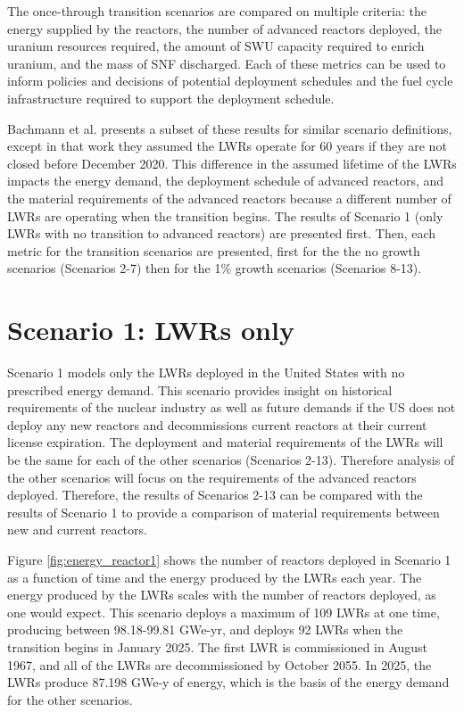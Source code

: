 The once-through transition scenarios are compared on multiple 
criteria: the energy supplied by the reactors, the number of 
advanced reactors deployed, the uranium resources required, the 
amount of \gls{SWU} capacity required to enrich uranium, and the 
mass of \gls{SNF} discharged. Each of these metrics can be used to inform 
policies and decisions of potential deployment schedules and the 
fuel cycle infrastructure required to support the deployment schedule. 

Bachmann et al. \cite{bachmann_enrichment_2021} presents a subset of 
these results for similar scenario definitions, except in that work 
they assumed the 
\glspl{LWR} operate for 60 years if they are not closed before December 
2020. This difference in 
the assumed lifetime of the \glspl{LWR} impacts the energy demand, 
the deployment schedule of advanced reactors, and the material 
requirements of the advanced reactors because a different number of 
\glspl{LWR} are operating when the transition begins. The results of 
Scenario 1 (only \glspl{LWR} with no transition to advanced reactors) 
are presented first. Then, each metric for the transition scenarios are 
presented, first for the the no growth scenarios 
(Scenarios 2-7) then for the 1\% growth scenarios (Scenarios 
8-13).

\section{Scenario 1: LWRs only}\label{sec:scenario1}
Scenario 1 models only the \glspl{LWR} deployed in the United States with no 
prescribed energy demand. This scenario provides insight on historical 
requirements of the nuclear industry as well as future demands if the 
US does not deploy any new reactors and decommissions current reactors at 
their current license expiration. The 
deployment and material requirements of the \glspl{LWR} will be the same 
for each of the other scenarios (Scenarios 2-13). Therefore analysis 
of the other scenarios will focus on the requirements of 
the advanced reactors deployed. Therefore, the results of Scenarios 2-13 
can be compared with the results of Scenario 1 to provide a comparison 
of material requirements between new and current reactors. 

Figure \ref{fig:energy_reactor1} shows the number of 
reactors deployed in Scenario 1 as a function of time and the energy 
produced by the \glspl{LWR} each year. The energy produced by the 
\glspl{LWR} scales with the number of reactors deployed, as 
one would expect. This scenario deploys a maximum of 109 
\glspl{LWR} at one time, producing 
between 98.18-99.81 GWe-yr, and deploys 92 \glspl{LWR}
when the transition begins in January 2025. The first \gls{LWR} is 
commissioned in August 1967, and all of the \glspl{LWR} are
decommissioned by October 2055. In 2025, the \glspl{LWR} produce 
87.198 GWe-y of energy, which is the basis of the energy demand for 
the other scenarios. 


